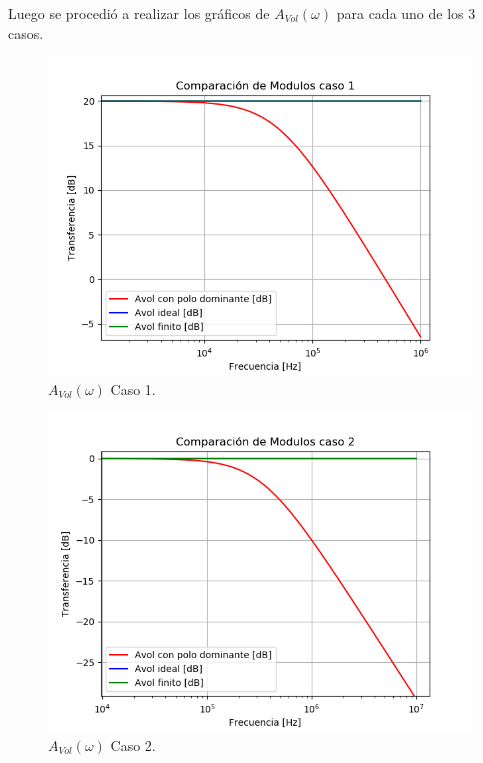 Luego se procedió a realizar los gráficos de $A_{Vol}(\omega)$ para cada uno de los 3 casos.
\begin{figure}[H]	
	\centering
	\includegraphics[width=\textwidth]{Ejercicio1/Imagenes/HCompC1.png}
	\caption{$A_{Vol}(\omega)$ Caso 1.}
	\label{fig:AvolC1}
\end{figure}
\begin{figure}[H]	
	\centering
	\includegraphics[width=\textwidth]{Ejercicio1/Imagenes/HCompC2.png}
	\caption{$A_{Vol}(\omega)$ Caso 2.}
	\label{fig:AvolC2}
\end{figure}
